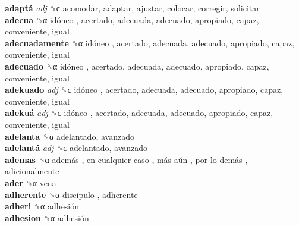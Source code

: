 \textbf{adaptá} \emph{adj}  ␝ϲ  acomodar, adaptar, ajustar, colocar, corregir, solicitar  \\
\textbf{adecua} ␝α   idóneo , acertado, adecuada, adecuado, apropiado, capaz, conveniente, igual  \\
\textbf{adecuadamente} ␝α   idóneo , acertado, adecuada, adecuado, apropiado, capaz, conveniente, igual  \\
\textbf{adecuado} ␝α   idóneo , acertado, adecuada, adecuado, apropiado, capaz, conveniente, igual  \\
\textbf{adekuado} \emph{adj}  ␝ϲ   idóneo , acertado, adecuada, adecuado, apropiado, capaz, conveniente, igual  \\
\textbf{adekuá} \emph{adj}  ␝ϲ   idóneo , acertado, adecuada, adecuado, apropiado, capaz, conveniente, igual  \\
\textbf{adelanta} ␝α  adelantado, avanzado  \\
\textbf{adelantá} \emph{adj}  ␝ϲ  adelantado, avanzado  \\
\textbf{ademas} ␝α   además ,  en cualquier caso ,  más aún ,  por lo demás , adicionalmente  \\
\textbf{ader} ␝α  vena  \\
\textbf{adherente} ␝α   discípulo , adherente  \\
\textbf{adheri} ␝α   adhesión   \\
\textbf{adhesion} ␝α   adhesión   \\
